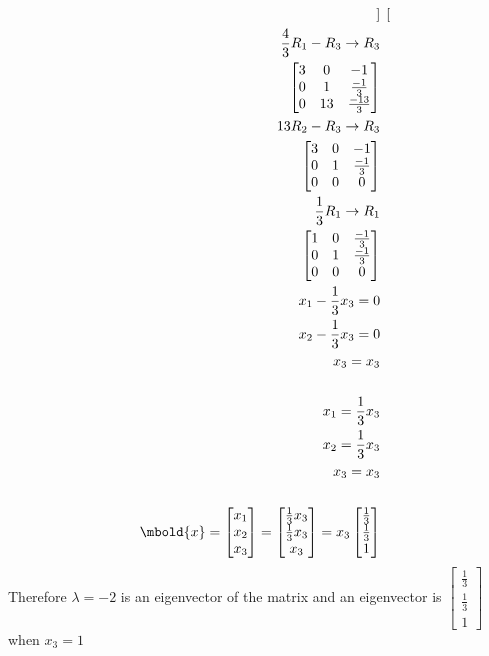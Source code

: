 \documentclass[12pt letter]{report}
\begin{document}
{\begin{align*}
\begin{bmatrix}
    \end{bmatrix}
    \\
    \frac{4}{3}R_1 - R_3  \rightarrow R_3 \\
    \begin{bmatrix}
      3 & 0  & -1            \\
      0 & 1  & \frac{-1}{3}  \\
      0 & 13 & \frac{-13}{3} \\
    \end{bmatrix}
    \\
    13R_2 - R_3  \rightarrow R_3          \\
    \begin{bmatrix}
      3 & 0 & -1           \\
      0 & 1 & \frac{-1}{3} \\
      0 & 0 & 0            \\
    \end{bmatrix}
    \\
    \frac{1}{3}R_1 \to R_1                \\
    \begin{bmatrix}
      1 & 0 & \frac{-1}{3} \\
      0 & 1 & \frac{-1}{3} \\
      0 & 0 & 0            \\
    \end{bmatrix}
    \\
    x_1 -\frac{1}{3}x_3 = 0               \\
    x_2 - \frac{1}{3}x_3 = 0              \\
    x_3 = x_3                             \\
    \\
    x_1 = \frac{1}{3}x_3                  \\
    x_2 = \frac{1}{3}x_3                  \\
    x_3 = x_3                             \\
    \\
    \mbold{x} = \begin{bmatrix} x_1 \\ x_2 \\ x_3 \end{bmatrix} = \begin{bmatrix} \frac{1}{3}x_3 \\ \frac{1}{3}x_3 \\ x_3
                                                                  \end{bmatrix}  = x_3 \begin{bmatrix} \frac{1}{3} \\ \frac{1}{3} \\ 1 \end{bmatrix}
  \end{align*}
  Therefore $\lambda = -2$ is an eigenvector of the matrix and an eigenvector is $\begin{bmatrix} \frac{1}{3} \\
      \frac{1}{3} \\ 1\end{bmatrix} $ when $x_3= 1$
}
\end{document}
